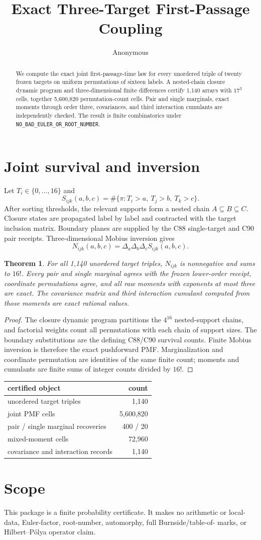 \documentclass[10pt]{article}
\title{Exact Three-Target First-Passage Coupling}
\author{Anonymous}
\date{}
\newtheorem{theorem}{Theorem}
\begin{document}
\maketitle
\begin{abstract}
We compute the exact joint first-passage-time law for every unordered triple
of twenty frozen targets on uniform permutations of sixteen labels.  A
nested-chain closure dynamic program and three-dimensional finite differences
certify 1,140 arrays with $17^3$ cells, together 5,600,820 permutation-count
cells.  Pair and single marginals, exact moments through order three,
covariances, and third interaction cumulants are independently checked.  The
result is finite combinatorics under
\texttt{NO\_BAD\_EULER\_OR\_ROOT\_NUMBER}.
\end{abstract}
\section{Joint survival and inversion}
Let $T_i\in\{0,\ldots,16\}$ and
\[
 S_{ijk}(a,b,c)=\#\{\pi:T_i>a,\ T_j>b,\ T_k>c\}.
\]
After sorting thresholds, the relevant supports form a nested chain
$A\subseteq B\subseteq C$.  Closure states are propagated label by label and
contracted with the target inclusion matrix.  Boundary planes are supplied by
the C88 single-target and C90 pair receipts.  Three-dimensional Mobius
inversion gives
\[
 N_{ijk}(a,b,c)=\Delta_a\Delta_b\Delta_c S_{ijk}(a,b,c).
\]
\begin{theorem}
For all 1,140 unordered target triples, $N_{ijk}$ is nonnegative and sums to
$16!$.  Every pair and single marginal agrees with the frozen lower-order
receipt, coordinate permutations agree, and all raw moments with exponents at
most three are exact.  The covariance matrix and third interaction cumulant
computed from those moments are exact rational values.
\end{theorem}
\begin{proof}
The closure dynamic program partitions the $4^{16}$ nested-support chains,
and factorial weights count all permutations with each chain of support sizes.
The boundary substitutions are the defining C88/C90 survival counts.  Finite
Mobius inversion is therefore the exact pushforward PMF.  Marginalization and
coordinate permutation are identities of the same finite count; moments and
cumulants are finite sums of integer counts divided by $16!$.
\end{proof}
\begin{center}
\begin{tabular}{lr}
\toprule
certified object & count\\
\midrule
unordered target triples & 1,140\\
joint PMF cells & 5,600,820\\
pair / single marginal recoveries & 400 / 20\\
mixed-moment cells & 72,960\\
covariance and interaction records & 1,140\\
\bottomrule
\end{tabular}
\end{center}
\section{Scope}
This package is a finite probability certificate.  It makes no arithmetic or
local-data, Euler-factor, root-number, automorphy, full Burnside/table-of-
marks, or Hilbert--P\'olya operator claim.
\end{document}
